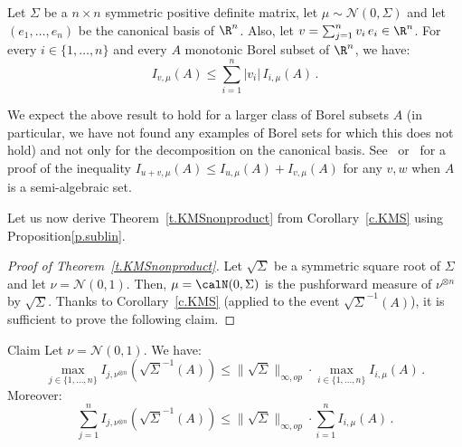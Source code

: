 \begin{prop}\label{p.sublin}
Let $\Sigma$ be a $n \times n$ symmetric positive definite matrix, let $\mu \sim \mathcal{N}(0,\Sigma)$ and let $\left(e_1,\dots, e_n \right)$ be the canonical basis of $\R^n$. Also, let $v = \sum_{j=1}^n v_i \, e_i \in \R^n$. For every $i \in \lbrace 1,\dots, n \rbrace$ and every $A$ monotonic Borel subset of $\R^n$, we have:
\begin{equation}\label{e.sublinrec}
I_{v,\mu}(A) \leq \sum_{i=1}^n |v_i| \, I_{i,\mu}(A) \,.
\end{equation}
\end{prop}

We expect the above result to hold for a larger class of Borel subsets $A$ (in particular, we have not found any examples of Borel sets for which this does not hold) and not only for the decomposition on the canonical basis. See~\cite[Chapter~7, Appendix~A]{alelele} or~\cite[Chapter~2, Appendix~A]{hugogogo} for a proof of the inequality $I_{u+v,\mu}(A)\leq I_{u,\mu}(A)+I_{v,\mu}(A)$ for any $v,w$ when $A$ is a semi-algebraic set.

Let us now derive Theorem~\ref{t.KMSnonproduct} from Corollary~\ref{c.KMS} using Proposition\ref{p.sublin}.

\begin{proof}[Proof of Theorem~\ref{t.KMSnonproduct}] Let $\sqrt{\Sigma}$ be a symmetric square root of $\Sigma$ and let $\nu=\mathcal{N}(0,1)$. Then, $\mu=\calN(0,\Sigma)$ is the pushforward measure of $\nu^{\otimes n}$ by $\sqrt{\Sigma}$. Thanks to Corollary~\ref{c.KMS} (applied to the event $\sqrt{\Sigma}^{-1}(A)$), it is sufficient to prove the following claim.
\end{proof}

\begin{enonce}{Claim}
Let $\nu = \mathcal{N}(0,1)$. We have:
\begin{equation}\label{e.cons_sublin_1}
\max_{j\in\lbrace 1,\dots, n\rbrace} I_{j,\nu^{\otimes n}}(\sqrt{\Sigma}^{-1} \left(A \right)) \leq \| \sqrt{\Sigma} \|_{\infty,op} \cdot \max_{i \in \lbrace 1,\dots, n \rbrace} I_{i,\mu}(A) \,.
\end{equation}
Moreover:
\begin{equation}\label{e.cons_sublin_2}
\sum_{j=1}^n I_{j,\nu^{\otimes n}}(\sqrt{\Sigma}^{-1} \left(A \right)) \leq \| \sqrt{\Sigma} \|_{\infty,op} \cdot \sum_{i=1}^n I_{i,\mu}(A) \,.
\end{equation}
\end{enonce}

